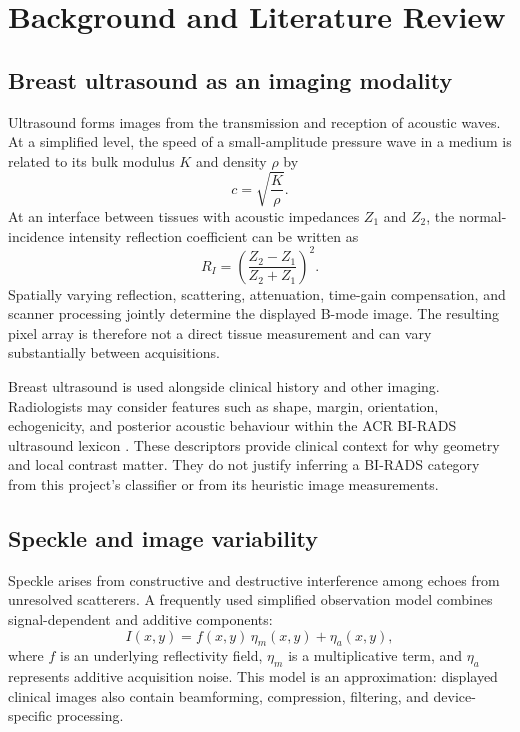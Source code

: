 \chapter{Background and Literature Review}
\label{ch:background}

\section{Breast ultrasound as an imaging modality}
Ultrasound forms images from the transmission and reception of acoustic waves. At a simplified level, the speed of a small-amplitude pressure wave in a medium is related to its bulk modulus $K$ and density $\rho$ by
\begin{equation}
c = \sqrt{\frac{K}{\rho}}.
\end{equation}
At an interface between tissues with acoustic impedances $Z_1$ and $Z_2$, the normal-incidence intensity reflection coefficient can be written as
\begin{equation}
R_I = \left(\frac{Z_2-Z_1}{Z_2+Z_1}\right)^2.
\end{equation}
Spatially varying reflection, scattering, attenuation, time-gain compensation, and scanner processing jointly determine the displayed B-mode image. The resulting pixel array is therefore not a direct tissue measurement and can vary substantially between acquisitions.

Breast ultrasound is used alongside clinical history and other imaging. Radiologists may consider features such as shape, margin, orientation, echogenicity, and posterior acoustic behaviour within the ACR BI-RADS ultrasound lexicon \citep{Mendelson2013,Stavros1995}. These descriptors provide clinical context for why geometry and local contrast matter. They do not justify inferring a BI-RADS category from this project's classifier or from its heuristic image measurements.

\section{Speckle and image variability}
Speckle arises from constructive and destructive interference among echoes from unresolved scatterers. A frequently used simplified observation model combines signal-dependent and additive components:
\begin{equation}
I(x,y)=f(x,y)\,\eta_m(x,y)+\eta_a(x,y),
\label{eq:speckle_model}
\end{equation}
where $f$ is an underlying reflectivity field, $\eta_m$ is a multiplicative term, and $\eta_a$ represents additive acquisition noise. This model is an approximation: displayed clinical images also contain beamforming, compression, filtering, and device-specific processing.


